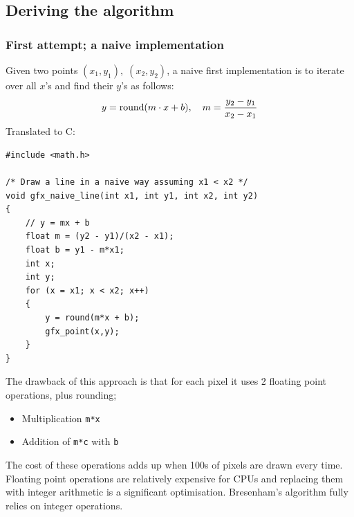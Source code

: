 \documentclass[a4paper]{article}
\begin{document}
\subsection{Deriving the algorithm}
\subsubsection{First attempt; a naive implementation}

Given two points $(x_1,y_1), \; (x_2,y_2)$, a naive first implementation is to iterate over all $x$'s and find their $y$'s as follows:
\begin{equation}
	y = \textup{round}(m\cdot x + b), \quad m = \frac{y_2 - y_1}{x_2 - x_1} 
\end{equation}
Translated to C:
\begin{verbatim}
#include <math.h>

/* Draw a line in a naive way assuming x1 < x2 */
void gfx_naive_line(int x1, int y1, int x2, int y2)
{
    // y = mx + b
    float m = (y2 - y1)/(x2 - x1);
    float b = y1 - m*x1; 
    int x;
    int y;
    for (x = x1; x < x2; x++)
    {
        y = round(m*x + b);
        gfx_point(x,y);
    }
}
\end{verbatim}
The drawback of this approach is that for each pixel it uses 2 floating point operations, plus rounding;
\begin{itemize}
	\item Multiplication \texttt{m*x}
	\item Addition of \texttt{m*c} with \texttt{b}
\end{itemize}
The cost of these operations adds up when 100s of pixels are drawn every time. Floating point operations are relatively expensive for CPUs and replacing them with integer arithmetic is a significant optimisation. Bresenham's algorithm fully relies on integer operations.
\end{document}
